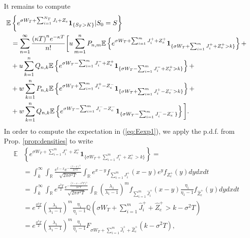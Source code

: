 \documentclass[11pt]{article}
\numberwithin{equation}{section}
\numberwithin{theorem}{section}
\def\Q{\mathbb{Q}}
\begin{document}
It remains to compute 
\begin{align}
   \mathbb{E}&\left\{ e^{\sigma W_{T}+\sum_{i=1}^{N_T}J_{i}+Z_{e}}\mathbf{1}_{\{S_{T}>K\}}\vert S_0=S\right\} \label{eq:leftpiece} \\
 & =  \sum_{n=1}^{\infty}\frac{\mbox{\ensuremath{\left(\kappa T\right)}}^{n}e^{-\kappa T}}{n!}\bigg[u\sum_{m=1}^{n}P_{n,m}\mathbb{E}\left\{ e^{\sigma W_{T}+\sum_{i=1}^{m}J_{i}^{+}+Z_{e}^{+}}\mathbf{1}_{\{ \sigma W_{T}+\sum_{i=1}^{m}J_{i}^{+}+Z_{e}^{+}>k \}}\right\} + \label{eq:Eexp1}\\
 &   +u\sum_{k=1}^{n}Q_{n,k}\mathbb{E}\left\{ e^{\sigma W_{T}-\sum_{i=1}^{m}J_{i}^{-}+Z_{e}^{+}}\mathbf{1}_{\{\sigma W_{T}-\sum_{i=1}^{m}J_{i}^{-}+Z_{e}^{+}>k\}}\right\} + \label{eq:Eexp2}\\
 &   +w\sum_{k=1}^{n}P_{n,k}\mathbb{E}\left\{ e^{\sigma W_{T}+\sum_{i=1}^{m}J_{i}^{+}-Z_{e}^{-}}\mathbf{1}_{\{\sigma W_{T}+\sum_{i=1}^{m}J_{i}^{+}-Z_{e}^{-}>k\}}\right\} + \label{eq:Eexp3}\\
 &   +w\sum_{k=1}^{n}Q_{n,k}\mathbb{E}\left\{ e^{\sigma W_{T}-\sum_{i=1}^{m}J_{i}^{-}-Z_{e}^{-}}\mathbf{1}_{\{\sigma W_{T}-\sum_{i=1}^{m}J_{i}^{-}-Z_{e}^{-}\}}\right\}\bigg].\label{eq:Eexp4}
\end{align}
In order to  compute the expectation    in (\ref{eq:Eexp1}), we apply the p.d.f. from 
Prop. \ref{prop:densities} to write
\begin{align}
  \mathbb{E}&\left\{ e^{\sigma W_{T}+\sum_{i=1}^{m}J_{i}^{+}+Z_{e}^{+}}\mathbf{1}_{\{\sigma W_{T}+\sum_{i=1}^{m}J_{i}^{+}+Z_{e}^{+}>k\}}\right\} = \nonumber \\
 & =   \int_{k}^{\infty}\int_{\mathbb{R}}\frac{e^{t-x}e^{-\frac{\left(t-x\right){}^{2}}{2\sigma^{2}T}}}{\sqrt{2\pi\sigma^{2}T}}\int_{\mathbb{R}}e^{x-y}f_{\sum_{i=1}^{m}J_{i}^{+}}\left(x-y\right)e^{y}f_{Z_{e}^{+}}\left(y\right)dydxdt\nonumber \\
 & =   \int_{k}^{\infty}\int_{\mathbb{R}}e^{\frac{\sigma^{2}T}{2}}\frac{e^{-\frac{\left(t-x-\sigma^{2}T\right){}^{2}}{2\sigma^{2}T}}}{\sqrt{2\pi\sigma^{2}T}}\int_{\mathbb{R}}\left(\frac{\lambda_{1}}{\lambda_{1}-1}\right)^{m}f_{\sum_{i=1}^{m}\hat{J}_{i}^{+}}\left(x-y\right)\frac{\eta_{1}}{\eta_{1}-1}f_{\hat{Z}_{e}^{+}}\left(y\right)dydxdt\nonumber \\
& = e^{\frac{\sigma^{2}T}{2}}\left(\frac{\lambda_{1}}{\lambda_{1}-1}\right)^m\frac{\eta_{1}}{\eta_{1}-1}\Q\left(\sigma W_{T}+\sum_{i=1}^{m}\hat{J}_{i}^{+}+\hat{Z}_{e}^{+}>k-\sigma^2T\right) \nonumber \\
& = e^{\frac{\sigma^{2}T}{2}}\left(\frac{\lambda_{1}}{\lambda_{1}-1}\right)^m\frac{\eta_{1}}{\eta_{1}-1}F_{\sigma W_{T}+\sum_{i=1}^{m}\hat{J}_{i}^{+}+\hat{Z}_{e}^{+}}\left(k-\sigma^2T\right) \label{eq:Eexp1_s}, 
\end{align}
\end{document}
